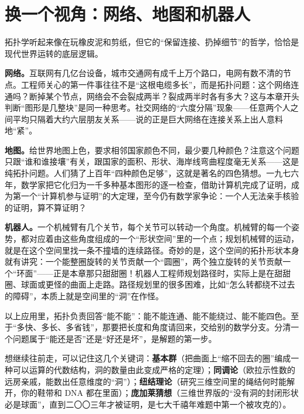 \section{换一个视角：网络、地图和机器人}

拓扑学听起来像在玩橡皮泥和剪纸，但它的“保留连接、扔掉细节”的哲学，恰恰是现代世界运转的底层逻辑。

\textbf{网络。}互联网有几亿台设备，城市交通网有成千上万个路口，电网有数不清的节点。工程师关心的第一件事往往不是“这根电缆多长”，而是拓扑问题：这个网络连通吗？断掉某个节点，网络会不会裂成两半？裂成两半时各有多大？这与本章开头判断“图形是几整块”是同一种思考。社交网络的“六度分隔”现象——任意两个人之间平均只隔着大约六层朋友关系——说的正是巨大网络在连接关系上出人意料地“紧”。

\textbf{地图。}给世界地图上色，要求相邻国家颜色不同，最少要几种颜色？注意这个问题只跟“谁和谁接壤”有关，跟国家的面积、形状、海岸线弯曲程度毫无关系——这是纯拓扑问题。人们猜了上百年“四种颜色足够”，这就是著名的四色猜想。一九七六年，数学家把它化归为一千多种基本图形的逐一检查，借助计算机完成了证明，成为第一个“计算机参与证明”的大定理，至今仍有数学家争论：一个人无法亲手核验的证明，算不算证明？

\textbf{机器人。}一个机械臂有几个关节，每个关节可以转动一个角度。机械臂的每一个姿势，都对应着由这些角度组成的一个“形状空间”里的一个点；规划机械臂的运动，就是在这个空间里找一条不撞墙的连续路径。奇妙的是，这个空间的拓扑形状本身就有讲究：一个能整圈旋转的关节贡献一个“圆圈”，两个独立旋转的关节贡献一个“环面”——正是本章那只甜甜圈！机器人工程师规划路径时，实际上是在甜甜圈、球面或更怪的曲面上走路。路径规划里的很多困难，比如“怎么转都绕不过去的障碍”，本质上就是空间里的“洞”在作怪。

\begin{zhu}
以上应用里，拓扑负责回答“能不能”：能不能连通、能不能绕过、能不能四色。至于“多快、多长、多省钱”，那要把长度和角度请回来，交给别的数学分支。分清一个问题属于“能还是否”还是“好还是坏”，是解题的第一步。
\end{zhu}

\begin{pandeng}
想继续往前走，可以记住这几个关键词：\textbf{基本群}（把曲面上“缩不回去的圈”编成一种可以运算的代数结构，洞的数量由此变成严格的定理）；\textbf{同调论}（欧拉示性数的远房亲戚，能数出任意维度的“洞”）；\textbf{纽结理论}（研究三维空间里的绳结何时能解开，你的鞋带和 DNA 都在里面）；\textbf{庞加莱猜想}（三维世界版的“没有洞的封闭形状必是球面”，直到二〇〇三年才被证明，是七大千禧年难题中第一个被攻克的）。
\end{pandeng}

